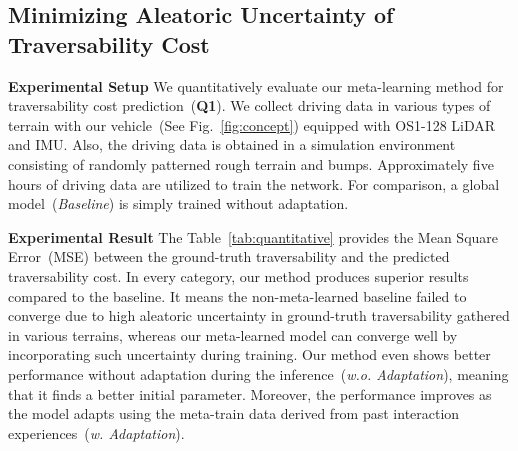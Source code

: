 \subsection{Minimizing Aleatoric Uncertainty of Traversability Cost}

\textbf{Experimental Setup}
We quantitatively evaluate our meta-learning method for traversability cost prediction~(\textbf{Q1}). We collect driving data in various types of terrain with our vehicle~(See Fig.~\ref{fig:concept}) equipped with OS1-128 LiDAR and IMU. Also, the driving data is obtained in a simulation environment consisting of randomly patterned rough terrain and bumps. Approximately five hours of driving data are utilized to train the network. For comparison, a global model~(\textit{Baseline}) is simply trained without adaptation.

\textbf{Experimental Result}
The Table~\ref{tab:quantitative} provides the Mean Square Error~(MSE) between the ground-truth traversability and the predicted traversability cost. In every category, our method produces superior results compared to the baseline. It means the non-meta-learned baseline failed to converge due to high aleatoric uncertainty in ground-truth traversability gathered in various terrains, whereas our meta-learned model can converge well by incorporating such uncertainty during training. Our method even shows better performance without adaptation during the inference~(\textit{w.o. Adaptation}), meaning that it finds a better initial parameter. Moreover, the performance improves as the model adapts using the meta-train data derived from past interaction experiences~(\textit{w. Adaptation}). 